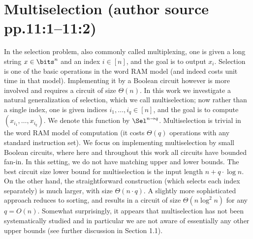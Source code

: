 \section*{Multiselection (author source pp.11:1--11:2)}
In the selection problem, also commonly called multiplexing, one is given a long string $x\in\bits^n$ and an index $i\in[n]$, and the goal is to output $x_i$. Selection is one of the basic operations in the word RAM model (and indeed costs unit time in that model). Implementing it by a Boolean circuit however is more involved and requires a circuit of size $\Theta(n)$.
In this work we investigate a natural generalization of selection, which we call multiselection; now rather than a single index, one is given indices $i_1,\ldots,i_q\in[n]$, and the goal is to compute $(x_{i_1},\ldots,x_{i_q})$. We denote this function by $\Sel^{n\to q}$. Multiselection is trivial in the word RAM model of computation (it costs $\Theta(q)$ operations with any standard instruction set). We focus on implementing multiselection by small Boolean circuits, where here and throughout this work all circuits have bounded fan-in. In this setting, we do not have matching upper and lower bounds. The best circuit size lower bound for multiselection is the input length $n+q\cdot\log n$. On the other hand, the straightforward construction (which selects each index separately) is much larger, with size $\Theta(n\cdot q)$. A slightly more sophisticated approach reduces to sorting, and results in a circuit of size $\Theta(n\log^2n)$ for any $q=O(n)$. Somewhat surprisingly, it appears that multiselection has not been systematically studied and in particular we are not aware of essentially any other upper bounds (see further discussion in Section 1.1).
